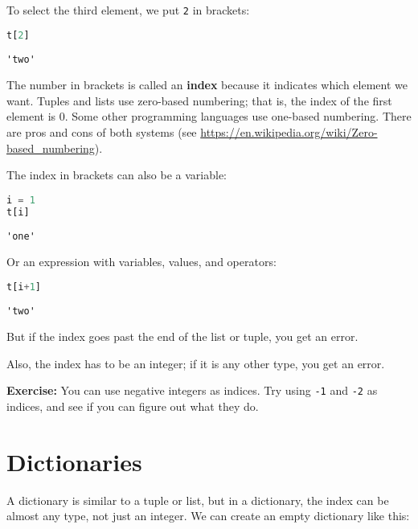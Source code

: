 To select the third element, we put \passthrough{\lstinline!2!} in
brackets:

\begin{lstlisting}[language=Python,style=source]
t[2]
\end{lstlisting}

\begin{lstlisting}[style=output]
'two'
\end{lstlisting}

The number in brackets is called an \textbf{index} because it indicates
which element we want. Tuples and lists use zero-based numbering; that
is, the index of the first element is 0. Some other programming
languages use one-based numbering. There are pros and cons of both
systems (see \url{https://en.wikipedia.org/wiki/Zero-based_numbering}).

The index in brackets can also be a variable:

\begin{lstlisting}[language=Python,style=source]
i = 1
t[i]
\end{lstlisting}

\begin{lstlisting}[style=output]
'one'
\end{lstlisting}

Or an expression with variables, values, and operators:

\begin{lstlisting}[language=Python,style=source]
t[i+1]
\end{lstlisting}

\begin{lstlisting}[style=output]
'two'
\end{lstlisting}

But if the index goes past the end of the list or tuple, you get an
error.

Also, the index has to be an integer; if it is any other type, you get
an error.

\textbf{Exercise:} You can use negative integers as indices. Try using
\passthrough{\lstinline!-1!} and \passthrough{\lstinline!-2!} as
indices, and see if you can figure out what they do.

\hypertarget{dictionaries-1}{%
\section{Dictionaries}\label{dictionaries-1}}

A dictionary is similar to a tuple or list, but in a dictionary, the
index can be almost any type, not just an integer. We can create an
empty dictionary like this:

